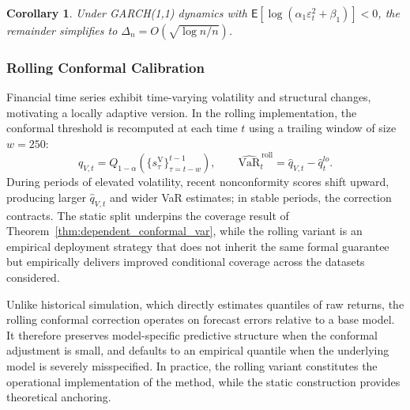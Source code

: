 \documentclass[preprint,11pt,authoryear]{elsarticle}
\newtheorem{corollary}[theorem]{Corollary}
\newcommand{\VaR}{\mathrm{VaR}}
\newcommand{\E}{\mathsf{E}}
\newcommand{\1}{\boldsymbol{1}}
\begin{document}
	\begin{corollary}
		\label{cor:garch_conformal_var}
		Under GARCH(1,1) dynamics with
		$\E[\log(\alpha_1\varepsilon_t^2 + \beta_1)] < 0$, the
		remainder simplifies to
		$\Delta_n = O(\sqrt{\log n / n})$.
	\end{corollary}
	
	\subsubsection{Rolling Conformal Calibration}
	\label{sec:rolling_method}
	
	Financial time series exhibit time-varying volatility and
	structural changes, motivating a locally adaptive version. In
	the rolling implementation, the conformal threshold is
	recomputed at each time $t$ using a trailing window of size
	$w = 250$:
	\begin{equation}
		\hat{q}_{V,t} = Q_{1-\alpha}\!\left(
		\{s_\tau^{\mathrm{V}}\}_{\tau=t-w}^{t-1}\right),
		\qquad
		\widehat{\VaR}_t^{\,\mathrm{roll}}
		= \hat{q}_{V,t} - \hat{q}_t^{lo}.
		\label{eq:var_roll}
	\end{equation}
	During periods of elevated volatility, recent nonconformity
	scores shift upward, producing larger $\hat{q}_{V,t}$ and
	wider VaR estimates; in stable periods, the correction
	contracts. The static split underpins the coverage result of
	Theorem~\ref{thm:dependent_conformal_var}, while the rolling
	variant is an empirical deployment strategy that does not
	inherit the same formal guarantee but empirically delivers
	improved conditional coverage across the datasets considered.

	Unlike historical simulation, which directly estimates quantiles of raw returns, the rolling conformal correction operates on forecast errors relative to a base model. It therefore preserves model-specific predictive structure when the conformal adjustment is small, and defaults to an empirical quantile when the underlying model is severely misspecified.
	In practice, the rolling variant constitutes the operational implementation of the method, while the static construction provides theoretical anchoring.
\end{document}
